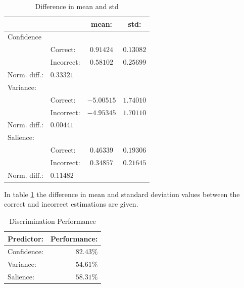 \documentclass{proc}
\begin{document}
\begin{table}[h]
    \begin{center}
        \begin{tabular}{ | l | l | c | c |}
            \hline
                        &           &   mean:       &   std:        \\ \hline
            Confidence  &           &               &               \\  \hline
                        & Correct:  &   $0.91424$   &   $0.13082$   \\  \hline
                        &Incorrect: &   $0.58102$   &   $0.25699$   \\  \hline
            Norm. diff.:    &   $0.33321$   &&\\  \hline
            \hline
            Variance:   &           &               &               \\  \hline
                        & Correct:  &   $-5.00515$  &   $1.74010$   \\  \hline
                        &Incorrect: &   $-4.95345$   &   $1.70110$   \\  \hline
            Norm. diff.:    &   $0.00441$   &&\\  \hline
            \hline
            Salience:   &           &               &               \\  \hline
                        & Correct:  &   $0.46339$   &   $0.19306$   \\  \hline
                        &Incorrect: &   $0.34857$   &   $0.21645$   \\  \hline
            Norm. diff.:    &   $0.11482$   &&\\  \hline
        \end{tabular}
        \caption{Difference in mean and std}
        \label{table:related}
    \end{center}
\end{table}
In table \ref{table:related} the difference in mean and standard deviation values between the correct and incorrect estimations are given.
\begin{table}[h]
    \begin{center}
        \begin{tabular}{ | l | r |}
            \hline
            Predictor:  &   Performance:\\  \hline
            \hline
            Confidence: &   $82.43\%$   \\  \hline
            Variance:   &   $54.61\%$   \\  \hline
            Salience:   &   $58.31\%$   \\  \hline
        \end{tabular}
        \caption{Discrimination Performance}
        \label{table:pred_cvs}
    \end{center}
\end{table}
\end{document}
